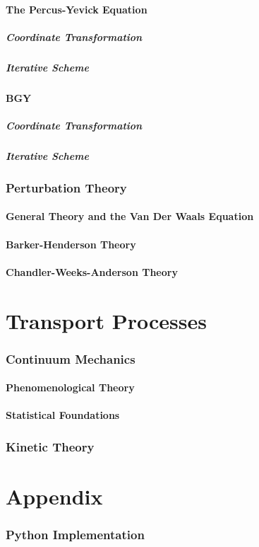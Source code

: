 \documentclass[a4paper,11pt]{article}
\begin{document}
\subsection{The Percus-Yevick Equation}
\subsubsection{Coordinate Transformation}
\subsubsection{Iterative Scheme}

\subsection{BGY}
\subsubsection{Coordinate Transformation}
\subsubsection{Iterative Scheme}

\section{Perturbation Theory}
\subsection{General Theory and the Van Der Waals Equation}
\subsection{Barker-Henderson Theory}
\subsection{Chandler-Weeks-Anderson Theory}

\part{Transport Processes}
\section{Continuum Mechanics}
\subsection{Phenomenological Theory}
\subsection{Statistical Foundations}

\section{Kinetic Theory}

\part{Appendix}
\appendix
\section{Python Implementation}
\end{document}
